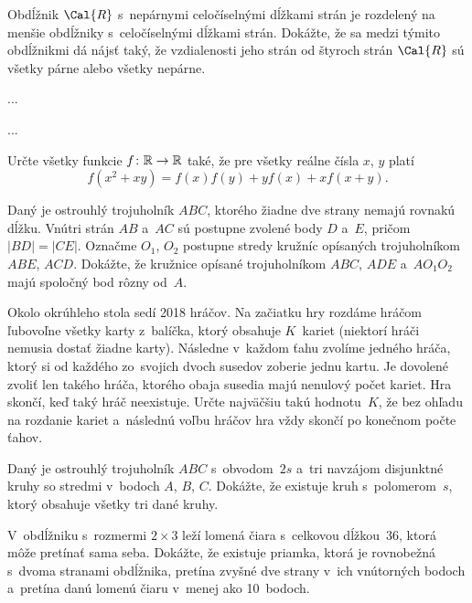 {%
Obdĺžnik $\Cal{R}$ s~nepárnymi celočíselnými dĺžkami strán je rozdelený na menšie obdĺžniky s~celočíselnými dĺžkami strán. Dokážte, že sa medzi týmito obdĺžnikmi dá nájsť taký, že vzdialenosti jeho strán od štyroch strán $\Cal{R}$ sú všetky párne alebo všetky nepárne.}

{%
...}

{%
...}

{%
Určte všetky funkcie $f\colon \Bbb{R} \to\Bbb{R}$ také, že pre všetky reálne čísla $x$, $y$ platí
$$
f(x^2 + xy) = f(x)f(y) + yf(x) + xf(x+y).
$$
}

{%
Daný je ostrouhlý trojuholník $ABC$, ktorého žiadne dve strany nemajú rovnakú dĺžku. Vnútri strán $AB$ a~$AC$ sú postupne zvolené body $D$ a~$E$, pričom $|BD|=|CE|$. Označme $O_1$, $O_2$ postupne stredy kružníc opísaných trojuholníkom $ABE$, $ACD$. Dokážte, že kružnice opísané trojuholníkom  $ABC$, $ADE$ a~$AO_1O_2$ majú spoločný bod rôzny od~$A$.}

{%
Okolo okrúhleho stola sedí 2018 hráčov. Na začiatku hry rozdáme hráčom ľubovoľne všetky karty z~balíčka, ktorý obsahuje $K$~kariet (niektorí hráči nemusia dostať žiadne karty). Následne v~každom ťahu zvolíme jedného hráča, ktorý si od každého zo~svojich dvoch susedov zoberie jednu kartu. Je dovolené zvoliť len takého hráča, ktorého obaja susedia majú nenulový počet kariet. Hra skončí, keď taký hráč neexistuje. Určte najväčšiu takú hodnotu~$K$, že bez ohľadu na rozdanie kariet a~následnú voľbu hráčov hra vždy skončí po konečnom počte ťahov.}

{%
Daný je ostrouhlý trojuholník $ABC$ s~obvodom~$2s$ a~tri navzájom disjunktné kruhy so stredmi v~bodoch $A$, $B$, $C$. Dokážte, že existuje kruh s~polomerom~$s$, ktorý obsahuje všetky tri dané kruhy.}

{%
V~obdĺžniku s~rozmermi $2\times 3$ leží lomená čiara s~celkovou dĺžkou~36, ktorá môže pretínať sama seba. Dokážte, že existuje priamka, ktorá je rovnobežná s~dvoma stranami obdĺžnika, pretína zvyšné dve strany v~ich vnútorných bodoch a~pretína danú lomenú čiaru v~menej ako 10~bodoch.}

